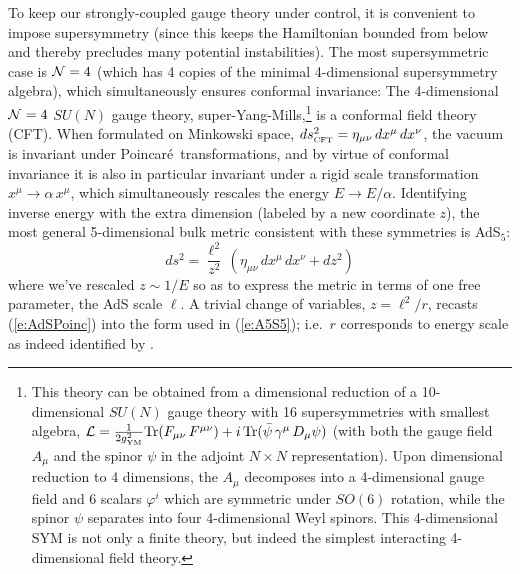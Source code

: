 \documentclass[12pt]{article}
\def\req#1{(\ref{#1})}
\def\SYM{super-Yang-Mills}
\def\Poinc{Poincar\' e}
\def\gYM{g_{\scriptscriptstyle {\rm YM}}}
\def\Rads{\ell}
\def\ph{\varphi}
\begin{document}
To keep our strongly-coupled gauge theory under control, it is convenient to impose supersymmetry (since this keeps the Hamiltonian bounded from below and thereby precludes many potential instabilities).  The most supersymmetric case is ${\cal N}=4$ (which has 4 copies of the minimal 4-dimensional supersymmetry algebra), which simultaneously ensures conformal invariance:  The 4-dimensional  ${\cal N}=4$ $SU(N)$ gauge theory, \SYM,\footnote{
This theory can be obtained from a dimensional reduction of a 10-dimensional $SU(N)$ gauge theory with 16 supersymmetries with smallest algebra, 
$ {\cal L} = \frac{1}{2\gYM^2}  {\rm Tr} ( F_{\mu\nu} \, F^{\mu\nu}) + i \, {\rm Tr} ( {\bar \psi} \, \gamma^\mu \, D_\mu \psi )$ (with both the gauge field $A_\mu$ and the spinor $\psi$  in the adjoint $N\times N$ representation).  Upon dimensional reduction to 4 dimensions, the $A_\mu$ decomposes into a 4-dimensional gauge field and 6 scalars $\ph^i$ which are symmetric under $SO(6)$ rotation, while the spinor $\psi$ separates into four 4-dimensional Weyl spinors.
This 4-dimensional SYM is not only a finite theory, but indeed the simplest interacting 4-dimensional field theory.
} is a conformal field theory (CFT).  When formulated on Minkowski space, 
$ds_{\scriptscriptstyle {\rm CFT}}^2 = \eta_{\mu\nu} \, dx^\mu \, dx^\nu$,
the vacuum is invariant under \Poinc\ transformations, and by virtue of conformal invariance it is also in particular invariant under a rigid scale transformation $x^\mu \to \alpha \, x^\mu$, which simultaneously rescales the energy $E \to E/\alpha$.  Identifying inverse energy with the extra dimension (labeled by a new coordinate $z$), the most general 5-dimensional bulk metric consistent with these symmetries is AdS$_5$:
%
\begin{equation}
ds^2 = \frac{\Rads^2}{z^2} \, \left(  \eta_{\mu\nu} \, dx^\mu \, dx^\nu + dz^2 \right)
\label{e:AdSPoinc}
\end{equation}	
%
where we've rescaled $z \sim 1/E$  so as to express the metric in terms of one free parameter, the AdS scale $\Rads$.  A trivial change of variables, $z=\Rads^2/r$, recasts \req{e:AdSPoinc} into the  form used in \req{e:A5S5}; i.e.\ $r$ corresponds to energy scale as indeed identified by \cite{Maldacena:1997re}.
\end{document}
